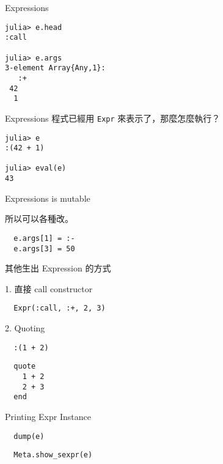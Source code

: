 \documentclass[14pt]{beamer}
\begin{document}
\begin{frame}[fragile]{Expressions}
\begin{lstlisting}
julia> e.head
:call

julia> e.args
3-element Array{Any,1}:
   :+
 42
  1
\end{lstlisting}
\end{frame}


\begin{frame}[fragile]{Expressions}
  程式已經用 \texttt{Expr} 來表示了，那麼怎麼執行？

  \pause

\begin{lstlisting}
julia> e
:(42 + 1)

julia> eval(e)
43
\end{lstlisting}
\end{frame}


\begin{frame}[fragile]{Expressions is mutable}

  所以可以各種改。

\begin{lstlisting}
  e.args[1] = :-
  e.args[3] = 50
\end{lstlisting}
\end{frame}


\begin{frame}[fragile]{其他生出 Expression 的方式}

  1. 直接 call constructor

\begin{lstlisting}
  Expr(:call, :+, 2, 3)
\end{lstlisting}

  \pause

  2. Quoting

\begin{lstlisting}
  :(1 + 2)
\end{lstlisting}
\begin{lstlisting}
  quote
    1 + 2
    2 + 3
  end
\end{lstlisting}

\end{frame}


\begin{frame}[fragile]{Printing Expr Instance}
\begin{lstlisting}
  dump(e)
\end{lstlisting}

\begin{lstlisting}
  Meta.show_sexpr(e)
\end{lstlisting}

\end{frame}
\end{document}
